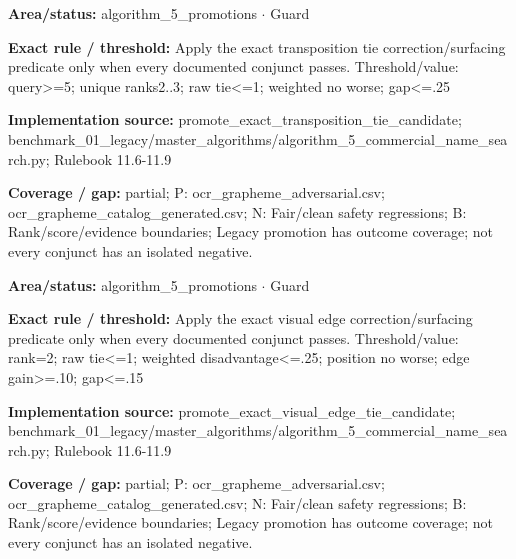 \begin{tcolorbox}[enhanced,breakable,colback=white,colframe=Muted!45,boxrule=0.45pt,arc=1.5pt,left=6pt,right=6pt,top=5pt,bottom=5pt,title={\texttt{A5-PROMOTE-EXACT-TRANSPOSITION-TIE}},title after break={\texttt{A5-PROMOTE-EXACT-TRANSPOSITION-TIE}\ (continued)},fonttitle=\headingfont\bfseries\color{Navy},coltitle=Navy]
\textbf{Area/status:} algorithm\_\allowbreak{}5\_\allowbreak{}promotions $\boldsymbol{\cdot}$ Guard\par
\smallskip
\textbf{Exact rule / threshold:} Apply the exact transposition tie correction/\allowbreak{}surfacing predicate only when every documented conjunct passes. Threshold/\allowbreak{}value: query>=5; unique ranks2..3; raw tie<=1; weighted no worse; gap<=.25\par
\smallskip
\textbf{Implementation source:} promote\_\allowbreak{}exact\_\allowbreak{}transposition\_\allowbreak{}tie\_\allowbreak{}candidate; benchmark\_\allowbreak{}01\_\allowbreak{}legacy/\allowbreak{}master\_\allowbreak{}algorithms/\allowbreak{}algorithm\_\allowbreak{}5\_\allowbreak{}commercial\_\allowbreak{}name\_\allowbreak{}search.py; Rulebook 11.6-11.9\par
\smallskip
\textbf{Coverage / gap:} partial; P: ocr\_\allowbreak{}grapheme\_\allowbreak{}adversarial.csv; ocr\_\allowbreak{}grapheme\_\allowbreak{}catalog\_\allowbreak{}generated.csv; N: Fair/\allowbreak{}clean safety regressions; B: Rank/\allowbreak{}score/\allowbreak{}evidence boundaries; Legacy promotion has outcome coverage; not every conjunct has an isolated negative.
\end{tcolorbox}
\begin{tcolorbox}[enhanced,breakable,colback=white,colframe=Muted!45,boxrule=0.45pt,arc=1.5pt,left=6pt,right=6pt,top=5pt,bottom=5pt,title={\texttt{A5-PROMOTE-EXACT-VISUAL-EDGE}},title after break={\texttt{A5-PROMOTE-EXACT-VISUAL-EDGE}\ (continued)},fonttitle=\headingfont\bfseries\color{Navy},coltitle=Navy]
\textbf{Area/status:} algorithm\_\allowbreak{}5\_\allowbreak{}promotions $\boldsymbol{\cdot}$ Guard\par
\smallskip
\textbf{Exact rule / threshold:} Apply the exact visual edge correction/\allowbreak{}surfacing predicate only when every documented conjunct passes. Threshold/\allowbreak{}value: rank=2; raw tie<=1; weighted disadvantage<=.25; position no worse; edge gain>=.10; gap<=.15\par
\smallskip
\textbf{Implementation source:} promote\_\allowbreak{}exact\_\allowbreak{}visual\_\allowbreak{}edge\_\allowbreak{}tie\_\allowbreak{}candidate; benchmark\_\allowbreak{}01\_\allowbreak{}legacy/\allowbreak{}master\_\allowbreak{}algorithms/\allowbreak{}algorithm\_\allowbreak{}5\_\allowbreak{}commercial\_\allowbreak{}name\_\allowbreak{}search.py; Rulebook 11.6-11.9\par
\smallskip
\textbf{Coverage / gap:} partial; P: ocr\_\allowbreak{}grapheme\_\allowbreak{}adversarial.csv; ocr\_\allowbreak{}grapheme\_\allowbreak{}catalog\_\allowbreak{}generated.csv; N: Fair/\allowbreak{}clean safety regressions; B: Rank/\allowbreak{}score/\allowbreak{}evidence boundaries; Legacy promotion has outcome coverage; not every conjunct has an isolated negative.
\end{tcolorbox}
